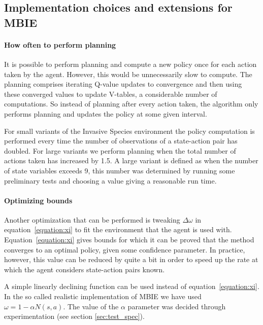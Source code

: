 \subsection{Implementation choices and extensions for MBIE}
\label{sec:MBIE_our_contribution}

\paragraph{How often to perform planning}
\label{sec:mbie_perform_planning}

It is possible to perform planning and compute a new policy once for each
action taken by the agent. However, this would be unnecessarily slow to
compute. The planning comprises iterating Q-value updates to convergence and
then using these converged values to update V-tables, a considerable number of
computations. So instead of planning after every action taken, the algorithm
only performs planning and updates the policy at some given interval. 

For small variants of the Invasive Species environment the policy computation
is performed every time the number of observations of a state-action pair has
doubled. For large variants we perform planning when the total number of
actions taken has increased by 1.5. A large variant is defined as when the
number of state variables exceeds 9, this number was determined by running some
preliminary tests and choosing a value giving a reasonable run time.

\paragraph{Optimizing bounds}

Another optimization that can be performed is tweaking $\Delta \omega$ in
equation~\eqref{equation:xi} to fit the environment that the agent is used
with. Equation~\eqref{equation:xi} gives bounds for which it can be proved that
the method converges to an optimal policy, given some confidence parameter. In
practice, however, this value can be reduced by quite a bit in order to speed
up the rate at which the agent considers state-action pairs known. 

A simple linearly declining function can be used instead of
equation~\eqref{equation:xi}. In the so called realistic implementation of MBIE
we have used $\omega = 1 - \alpha N(s,a).$ The value of the $\alpha$ parameter
was decided through experimentation (see section \ref{sec:test_spec}).

